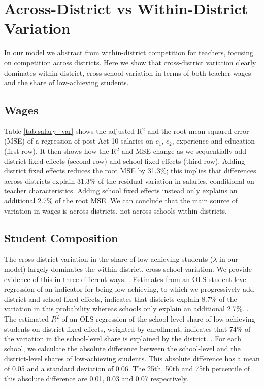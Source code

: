 \documentclass[notitlepage,12pt]{article}%
\begin{document}
\section{Across-District vs Within-District Variation}

In our model we abstract from within-district competition for teachers,
focusing on competition across districts. Here we show that cross-district
variation clearly dominates within-district, cross-school variation in terms
of both teacher wages and the share of low-achieving students.

\subsection{Wages}

Table \ref{tab:salary_var} shows the adjusted R$^{2}$ and the root
mean-squared error (MSE) of a regression of post-Act 10 salaries on $c_{1}$,
$c_{2}$, experience and education (first row). It then shows how the R$^{2}$
and MSE change as we sequentially add district fixed effects (second row) and
school fixed effects (third row). Adding district fixed effects reduces the
root MSE by 31.3\%; this implies that differences across districts explain
31.3\% of the residual variation in salaries, conditional on teacher
characteristics. Adding school fixed effects instead only explains an
additional 2.7\% of the root MSE. We can conclude that the main source of
variation in wages is across districts, not across schools within districts.

\subsection{Student Composition}

The cross-district variation in the share of low-achieving students ($\lambda$
in our model) largely dominates the within-district, cross-school variation.
We provide evidence of this in three different ways. . Estimates from
an OLS student-level regression of an indicator for being low-achieving, to
which we progressively add district and school fixed effects, indicates that
districts explain 8.7\% of the variation in this probability whereas schools
only explain an additional 2.7\%. . The estimated $R^{2}$ of an OLS
regression of the school-level share of low-achieving students on district
fixed effects, weighted by enrollment, indicates that 74\% of the variation in
the school-level share is explained by the district. . For each
school, we calculate the absolute difference between the school-level and the
district-level shares of low-achieving students. This absolute difference has
a mean of 0.05 and a standard deviation of 0.06. The 25th, 50th and 75th
percentile of this absolute difference are 0.01, 0.03 and 0.07 respectively.
\end{document}

